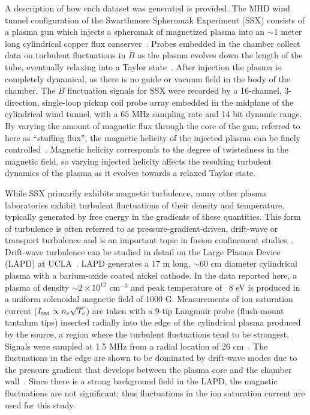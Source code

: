 \documentclass[aps,prx,twocolumn,secnumarabic,nobalancelastpage,amsmath,amssymb,
nofootinbib]{revtex4-1}
\begin{document}
A description of how each dataset was generated is provided. The MHD wind tunnel configuration of the Swarthmore Spheromak Experiment (SSX) consists of a plasma gun which injects a spheromak of magnetized plasma into an $\sim1$ meter long cylindrical copper flux conserver~\cite{gray2013}. Probes embedded in the chamber collect data on turbulent fluctuations in $\dot{B}$ as the plasma evolves down the length of the tube, eventually relaxing into a Taylor state~\cite{gray2013,schaffner2014a,schaffner2014b,schaffner2014c}. After injection the plasma is completely dynamical, as there is no guide or vacuum field in the body of the chamber. The $\dot{B}$ fluctuation signals for SSX  were recorded by a 16-channel, 3-direction, single-loop pickup coil probe array embedded in the midplane of the cylindrical wind tunnel, with a $65$ MHz sampling rate and 14 bit dynamic range. By varying the amount of magnetic flux through the core of the gun, referred to here as ``stuffing flux'', the magnetic helicity of the injected plasma can be finely controlled~\cite{schaffner2014b}. Magnetic helicity corresponds to the degree of twistedness in the magnetic field, so varying injected helicity affects the resulting turbulent dynamics of the plasma as it evolves towards a relaxed Taylor state.

While SSX primarily exhibits magnetic turbulence, many other plasma laboratories exhibit turbulent fluctuations of their density and temperature, typically generated by free energy in the gradients of these quantities. This form of turbulence is often referred to as pressure-gradient-driven, drift-wave or transport turbulence and is an important topic in fusion confinement studies~\cite{burrell1997}. Drift-wave turbulence can be studied in detail on the Large Plasma Device (LAPD) at UCLA~\cite{gekelman1991}. LAPD generates a 17 m long, $\sim$60 cm diameter cylindrical plasma with a barium-oxide coated nickel cathode. In the data reported here, a plasma of density $\sim$$2 \times 10^{12}$ cm$^{-3}$ and peak temperature of ~8 eV is produced in a uniform solenoidal magnetic field of 1000 G. Measurements of ion saturation current ($I_{\rm sat} \propto n_e \sqrt{T_e}$) are taken with a 9-tip Langmuir probe (flush-mount tantalum tips) inserted radially into the edge of the cylindrical plasma produced by the source, a region where the turbulent fluctuations tend to be strongest. Signals were sampled at 1.5 MHz from a radial location of 26 cm~\cite{schaffner2012}. The fluctuations in the edge are shown to be dominated by drift-wave modes due to the pressure gradient that develops between the plasma core and the chamber wall~\cite{maggs1996}. Since there is a strong background field in the LAPD, the magnetic fluctuations are not significant; thus fluctuations in the ion saturation current are used for this study.
\end{document}
